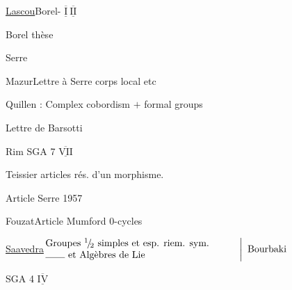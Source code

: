 \uline{Lascou}\qquad Borel- $\overline{\underline{\mathrm I}}\ \overline{\underline{\mathrm {II}}}$

Borel thèse

Serre 

Mazur\qquad Lettre à Serre corps  local etc


Quillen : Complex cobordism $+$ formal groups

Lettre de Barsotti

Rim SGA 7 $\overline{\underline{\mathrm{VII}}}$

Teissier articles  rés. d'un morphisme.

\qquad Article Serre 1957

Fouzat\qquad Article Mumford $0$-cycles

\uline{Saavedra}\qquad \(\left.\begin{array}{@{}p{.58\linewidth}@{}}Groupes ${}^{1}\!/\!{}_{2}$ simples et esp. riem. sym.\\\rule{2em}{.35pt} et Algèbres de Lie\end{array}\right\vert\ \text{Bourbaki}\)

SGA 4 $\overline{\underline{\mathrm{IV}}}$

\clearpage
